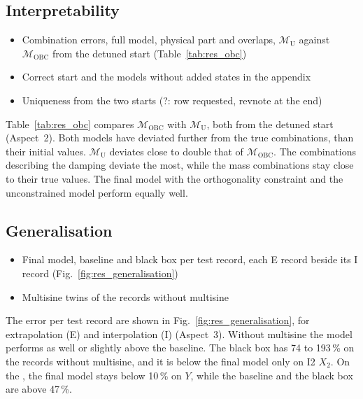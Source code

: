 \subsection{Interpretability}
\ifdraft
\begin{itemize}
\item Combination errors, full model, physical part and overlaps, $\mathcal M_{\mathrm U}$ against $\mathcal M_{\mathrm{OBC}}$ from the detuned start (Table~\ref{tab:res_obc})
\item Correct start and the models without added states in the appendix
\item Uniqueness from the two starts (?: row requested, revnote at the end)
\end{itemize}
\fi
Table~\ref{tab:res_obc} compares $\mathcal M_{\mathrm{OBC}}$ with
$\mathcal M_{\mathrm U}$, both from the detuned start (Aspect~2).
Both models have deviated further from the true combinations, than their initial values.
$\mathcal M_{\mathrm U}$ deviates close to double that of $\mathcal M_{\mathrm{OBC}}$.
The combinations describing the damping deviate the most, 
while the mass combinations stay close to their true values.
The final model with the orthogonality constraint and the unconstrained model
perform equally well. 

\begin{table}[t]
  \centering
  \caption{Relative error of the ten combinations, unconstrained and OBC, from the detuned start.}
  \label{tab:res_obc}
  
\end{table}

\subsection{Generalisation}
\ifdraft
\begin{itemize}
\item Final model, baseline and black box per test record, each E record beside its I record (Fig.~\ref{fig:res_generalisation})
\item Multisine twins of the records without multisine
\end{itemize}
\fi
The error per test record are shown in Fig.~\ref{fig:res_generalisation}, 
for extrapolation (E) and interpolation (I) (Aspect~3).
Without multisine the model performs as well or slightly above the baseline.
The black box has 74 to 193\,\% on the records without multisine, and it is
below the final model only on I2 $X_2$.
On the , the final model stays below 10\,\% on $Y$, while the
baseline and the black box are above 47\,\%.

